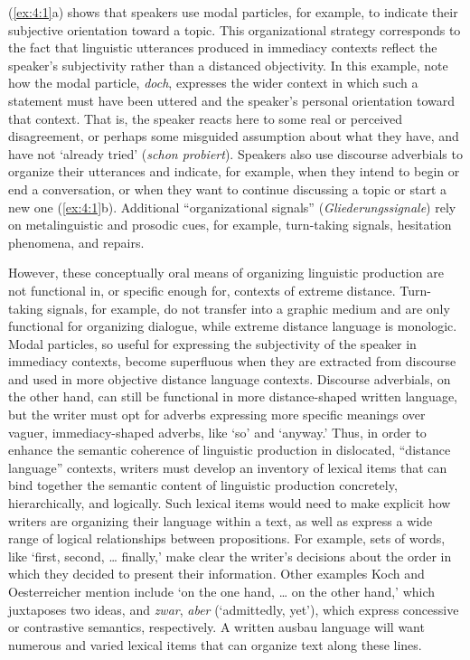 \noindent (\ref{ex:4:1}a) shows that speakers use modal particles, for example, to indicate their subjective orientation toward a topic. This organizational strategy corresponds to the fact that linguistic utterances produced in immediacy contexts reflect the speaker’s subjectivity rather than a distanced objectivity. In this example, note how the modal particle, \textit{doch}, expresses the wider context in which such a statement must have been uttered and the speaker’s personal orientation toward that context. That is, the speaker reacts here to some real or perceived disagreement, or perhaps some misguided assumption about what they have, and have not ‘already tried' (\textit{schon probiert}). Speakers also use discourse adverbials to organize their utterances and indicate, for example, when they intend to begin or end a conversation, or when they want to continue discussing a topic or start a new one (\ref{ex:4:1}b). Additional “organizational signals” (\textit{Gliederungssignale}) rely on metalinguistic and prosodic cues, for example, turn-taking signals, hesitation phenomena, and repairs.

However, these conceptually oral means of organizing linguistic production are not functional in, or specific enough for, contexts of extreme distance. Turn-taking signals, for example, do not transfer into a graphic medium and are only functional for organizing dialogue, while extreme distance language is monologic. Modal particles, so useful for expressing the subjectivity of the speaker in immediacy contexts, become superfluous when they are extracted from discourse and used in more objective distance language contexts. Discourse adverbials, on the other hand, can still be functional in more distance-shaped written language, but the writer must opt for adverbs expressing more specific meanings over vaguer, immediacy-shaped adverbs, like ‘so’ and ‘anyway.’ Thus, in order to enhance the semantic coherence of linguistic production in dislocated, “distance language” contexts, writers must develop an inventory of lexical items that can bind together the semantic content of linguistic production concretely, hierarchically, and logically. Such lexical items would need to make explicit how writers are organizing their language within a text, as well as express a wide range of logical relationships between propositions. For example, sets of words, like ‘first, second, … finally,' make clear the writer’s decisions about the order in which they decided to present their information. Other examples Koch and Oesterreicher mention include ‘on the one hand, … on the other hand,' which juxtaposes two ideas, and \textit{zwar}, \textit{aber} (‘admittedly, yet’), which express concessive or contrastive semantics, respectively. A written ausbau language will want numerous and varied lexical items that can organize text along these lines.

